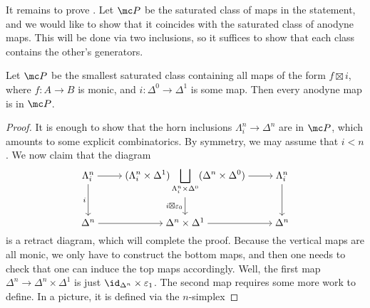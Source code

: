 \documentclass[../notes.tex]{subfiles}
\begin{document}
It remains to prove . Let $\mc P$ be the saturated class of maps in the statement, and we would like to show that it coincides with the saturated class of anodyne maps. This will be done via two inclusions, so it suffices to show that each class contains the other's generators.
\begin{lemma}
	Let $\mc P$ be the smallest saturated class containing all maps of the form $f\boxtimes i$, where $f\colon A\to B$ is monic, and $i\colon\Delta^0\to\Delta^1$ is some map. Then every anodyne map is in $\mc P$.
\end{lemma}
\begin{proof}
	It is enough to show that the horn inclusions $\Lambda^n_i\to\Delta^n$ are in $\mc P$, which amounts to some explicit combinatorics. By symmetry, we may assume that $i<n$. We now claim that the diagram
	\[\begin{tikzcd}[cramped]
		{\Lambda^n_i} & {\displaystyle(\Lambda^n_i\times\Delta^1)\bigsqcup_{\Lambda^n_i\times\Delta^0}(\Delta^n\times\Delta^0)} & {\Lambda_i^n} \\
		{\Delta^n} & {\Delta^n\times\Delta^1} & {\Delta^n}
		\arrow[from=1-1, to=1-2]
		\arrow["i"', from=1-1, to=2-1]
		\arrow[from=1-2, to=1-3]
		\arrow["{i\boxtimes\varepsilon_0}"', from=1-2, to=2-2]
		\arrow[from=1-3, to=2-3]
		\arrow[from=2-1, to=2-2]
		\arrow[from=2-2, to=2-3]
	\end{tikzcd}\]
	is a retract diagram, which will complete the proof. Because the vertical maps are all monic, we only have to construct the bottom maps, and then one needs to check that one can induce the top maps accordingly. Well, the first map $\Delta^n\to\Delta^n\times\Delta^1$ is just ${\id_{\Delta^n}}\times\varepsilon_1$. The second map requires some more work to define. In a picture, it is defined via the $n$-simplex

\end{proof}
\end{document}
